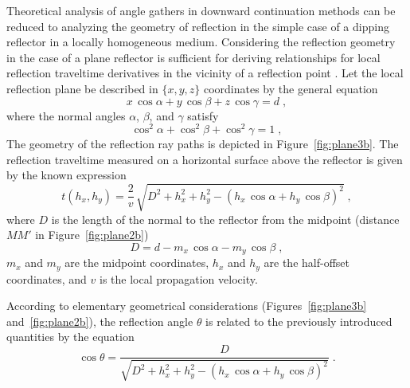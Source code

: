 Theoretical analysis of angle gathers in downward continuation methods can be
reduced to analyzing the geometry of reflection in the simple case of a
dipping reflector in a locally homogeneous medium. Considering the reflection
geometry in the case of a plane reflector is sufficient for deriving
relationships for local reflection traveltime derivatives in the vicinity of a
reflection point \cite[]{goldin}. Let the local reflection plane be described in
$\{x,y,z\}$ coordinates by the general equation
\begin{equation}
  \label{eq:plane}
  x\,\cos{\alpha} + y\,\cos{\beta} + z\,\cos{\gamma} = d\;,
\end{equation}
where the normal angles $\alpha$, $\beta$, and $\gamma$ satisfy
\begin{equation}
  \label{eq:norm}
  \cos^2{\alpha} + \cos^2{\beta} + \cos^2{\gamma} = 1\;,
\end{equation}
The geometry of the reflection ray paths is depicted in
Figure~\ref{fig:plane3b}.  The reflection traveltime measured on a
horizontal surface above the reflector is given by the known expression
\cite[]{LSC00-00-02680268,GEO36-03-05100516}
\begin{equation}
  \label{eq:ttime}
  t(h_x,h_y) =
  \frac{2}{v}\,\sqrt{D^2+h_x^2+h_y^2-
    \left(h_x\,\cos{\alpha} + h_y\,\cos{\beta}\right)^2}\;,
\end{equation}
where $D$ is the length of the normal to the reflector from the
midpoint (distance $MM'$ in Figure~\ref{fig:plane2b})
\begin{equation}
  \label{eq:dmm}
  D = d - m_x\,\cos{\alpha} - m_y\,\cos{\beta}\;,
\end{equation}
$m_x$ and $m_y$ are the midpoint coordinates, $h_x$ and $h_y$ are the
half-offset coordinates, and $v$ is the local propagation velocity.


According to elementary geometrical considerations
(Figures~\ref{fig:plane3b} and~\ref{fig:plane2b}), the reflection angle $\theta$
is related to the previously introduced quantities by the equation
\begin{equation}
  \label{eq:theta}
  \cos{\theta} = \frac{D}{\sqrt{D^2+h_x^2+h_y^2-
      \left(h_x\,\cos{\alpha} + h_y\,\cos{\beta}\right)^2}}\;.
\end{equation}

